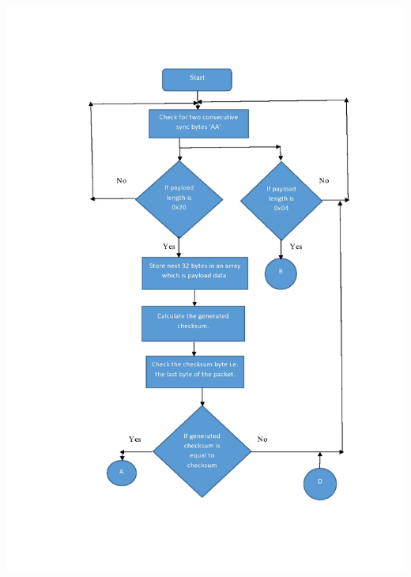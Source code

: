 \documentclass[14pt]{article}
\begin{document}
\begin{center}
	\graphicspath{ {images/} }
	\includegraphics[width=18cm, height=23cm]{Flowchart1}
\end{center}
\end{document}
